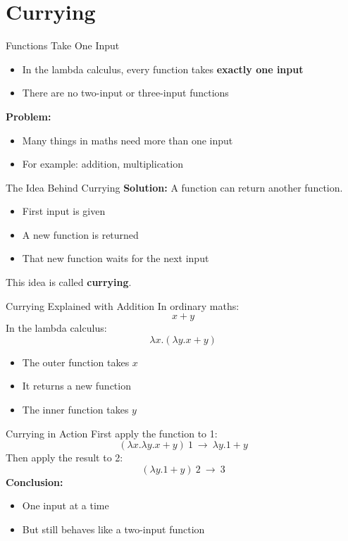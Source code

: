 \documentclass{beamer}
\begin{document}
\section{Currying}
\begin{frame}{Functions Take One Input}
  \begin{itemize}
    \item In the lambda calculus, every function takes \textbf{exactly one input}
    \item There are no two-input or three-input functions
  \end{itemize}
  \textbf{Problem:}
  \begin{itemize}
    \item Many things in maths need more than one input
    \item For example: addition, multiplication
  \end{itemize}
\end{frame}
\begin{frame}{The Idea Behind Currying}
  \textbf{Solution:} A function can return another function.
  \begin{itemize}
    \item First input is given
    \item A new function is returned
    \item That new function waits for the next input
  \end{itemize}
  This idea is called \textbf{currying}.
\end{frame}
\begin{frame}{Currying Explained with Addition}
  In ordinary maths: \[x+y\]
  In the lambda calculus: \[\lambda x.(\lambda y.x+y)\]
  \begin{itemize}
    \item The outer function takes $x$
    \item It returns a new function
    \item The inner function takes $y$
  \end{itemize}
\end{frame}
\begin{frame}{Currying in Action}
  First apply the function to 1:
  \[(\lambda x.\lambda y.x+y)\ 1\ \longrightarrow\ \lambda y.1+y\]
  Then apply the result to 2:
  \[(\lambda y.1+y)\ 2\ \longrightarrow\ 3\]
  \textbf{Conclusion:}
  \begin{itemize}
    \item One input at a time
    \item But still behaves like a two-input function
  \end{itemize}
\end{frame}
\end{document}
